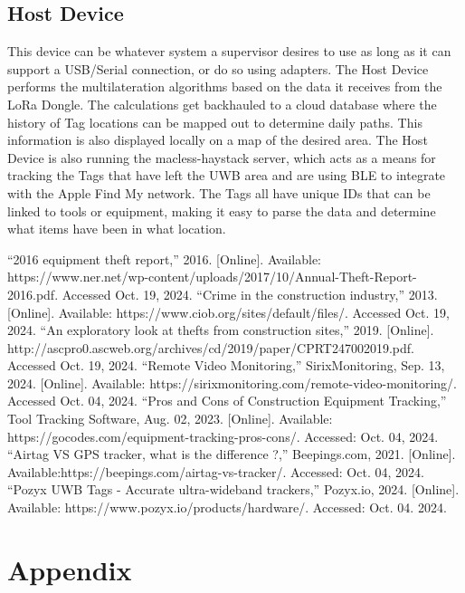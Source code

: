 \documentclass[conference]{IEEEtran}
\begin{document}
\subsection{Host Device}

This device can be whatever system a supervisor desires to use as long as 
it can support a USB/Serial connection, or do so using adapters. The Host Device
performs the multilateration algorithms based on the data it receives from the LoRa Dongle.
The calculations get backhauled to a cloud database 
where the history of Tag locations can be mapped out to determine 
daily paths. This information is also displayed locally on a map of 
the desired area. The Host Device is also running the macless-haystack 
server, which acts as a means for tracking the Tags that have 
left the UWB area and are using BLE to integrate with the Apple Find 
My network. The Tags all have unique IDs that can be linked to tools or 
equipment, making it easy to parse the data and determine what items have 
been in what location. 


\begin{thebibliography}{00}
 ``2016 equipment theft report,'' 2016. [Online]. Available: https://www.ner.net/wp-content/uploads/2017/10/Annual-Theft-Report-2016.pdf. Accessed Oct. 19, 2024.
 ``Crime in the construction industry,'' 2013. [Online]. Available: https://www.ciob.org/sites/default/files/. Accessed Oct. 19, 2024.
 ``An exploratory look at thefts from construction sites,'' 2019. [Online]. http://ascpro0.ascweb.org/archives/cd/2019/paper/CPRT247002019.pdf. Accessed Oct. 19, 2024.
 ``Remote Video Monitoring,'' SirixMonitoring, Sep. 13, 2024. [Online]. Available: https://sirixmonitoring.com/remote-video-monitoring/. Accessed Oct. 04, 2024.
 ``Pros and Cons of Construction Equipment Tracking,'' Tool Tracking Software, Aug. 02, 2023. [Online]. Available:  https://gocodes.com/equipment-tracking-pros-cons/. Accessed: Oct. 04, 2024.
 ``Airtag VS GPS tracker, what is the difference ?,'' Beepings.com, 2021. [Online]. Available:https://beepings.com/airtag-vs-tracker/. Accessed: Oct. 04, 2024.
 ``Pozyx UWB Tags - Accurate ultra-wideband trackers,'' Pozyx.io, 2024. [Online]. Available: https://www.pozyx.io/products/hardware/. Accessed: Oct. 04. 2024.
\end{thebibliography}
\vspace{12pt}

\section*{Appendix}
\setcounter{subsection}{0}
\end{document}
